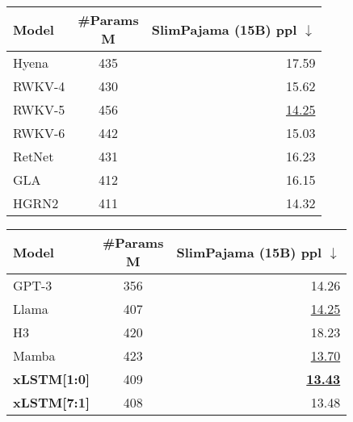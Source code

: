 \begin{minipage}{0.45\textwidth}

\begin{tabular}{lcr}
    \toprule
    Model               & \thead{\#Params                              \\ M} & \thead{SlimPajama \\ (15B) ppl $\downarrow$}\\
    \midrule
    Hyena               & 435             & 17.59                      \\
    RWKV-4              & 430             & 15.62          \\
    RWKV-5              & 456             & \underline{14.25}                      \\
    RWKV-6              & 442             & 15.03                      \\
    RetNet              & 431             & 16.23                      \\
    GLA                 & 412             & 16.15                      \\
    HGRN2               & 411             & 14.32                      \\
    \bottomrule
\end{tabular}
\end{minipage}
\begin{minipage}{0.45\textwidth}
\vspace{-0.05cm}
\begin{tabular}{lcr}
    \toprule
    Model               & \thead{\#Params                              \\ M} & \thead{SlimPajama \\ (15B) ppl $\downarrow$}\\
    \midrule
    GPT-3               & 356             & 14.26                      \\
    Llama               & 407             & \underline{14.25}          \\
    \midrule
    H3                  & 420             & 18.23                      \\
    Mamba               & 423             & \underline{13.70}          \\
    \midrule
    \textbf{xLSTM[1:0]} & 409             & \underline{\textbf{13.43}} \\
    \textbf{xLSTM[7:1]} & 408             & 13.48                      \\
    \bottomrule
\end{tabular}
\end{minipage}
